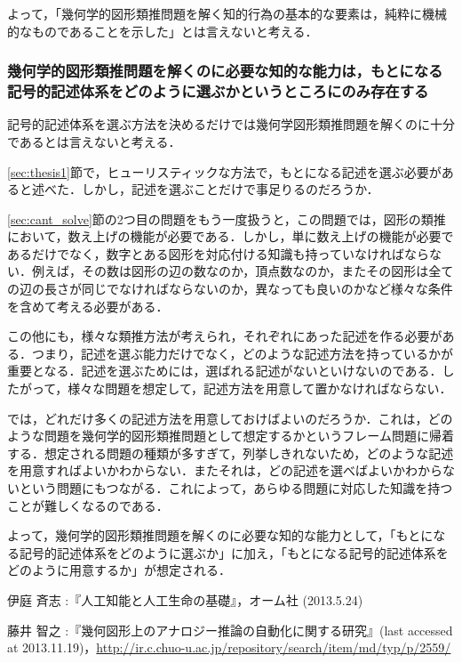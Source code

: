 \documentclass{jarticle}
\begin{document}
よって，「幾何学的図形類推問題を解く知的行為の基本的な要素は，純粋に機械的なものであることを示した」とは言えないと考える．





\subsubsection{幾何学的図形類推問題を解くのに必要な知的な能力は，もとになる記号的記述体系をどのように選ぶかというところにのみ存在する}
記号的記述体系を選ぶ方法を決めるだけでは幾何学図形類推問題を解くのに十分であるとは言えないと考える．

\ref{sec:thesis1}節で，ヒューリスティックな方法で，もとになる記述を選ぶ必要があると述べた．しかし，記述を選ぶことだけで事足りるのだろうか．

\ref{sec:cant_solve}節の2つ目の問題をもう一度扱うと，この問題では，図形の類推において，数え上げの機能が必要である．しかし，単に数え上げの機能が必要であるだけでなく，数字とある図形を対応付ける知識も持っていなければならない．例えば，その数は図形の辺の数なのか，頂点数なのか，またその図形は全ての辺の長さが同じでなければならないのか，異なっても良いのかなど様々な条件を含めて考える必要がある．

この他にも，様々な類推方法が考えられ，それぞれにあった記述を作る必要がある．つまり，記述を選ぶ能力だけでなく，どのような記述方法を持っているかが重要となる．記述を選ぶためには，選ばれる記述がないといけないのである．したがって，様々な問題を想定して，記述方法を用意して置かなければならない．

では，どれだけ多くの記述方法を用意しておけばよいのだろうか．これは，どのような問題を幾何学的図形類推問題として想定するかというフレーム問題に帰着する．想定される問題の種類が多すぎて，列挙しきれないため，どのような記述を用意すればよいかわからない．またそれは，どの記述を選べばよいかわからないという問題にもつながる．これによって，あらゆる問題に対応した知識を持つことが難しくなるのである．

よって，幾何学的図形類推問題を解くのに必要な知的な能力として，「もとになる記号的記述体系をどのように選ぶか」に加え，「もとになる記号的記述体系をどのように用意するか」が想定される．




\begin{thebibliography}{n}
伊庭 斉志 :『人工知能と人工生命の基礎』，オーム社 (2013.5.24)

藤井 智之 :『幾何図形上のアナロジー推論の自動化に関する研究』(last accessed at 2013.11.19)，\url{http://ir.c.chuo-u.ac.jp/repository/search/item/md/typ/p/2559/}

\end{thebibliography}
\end{document}
